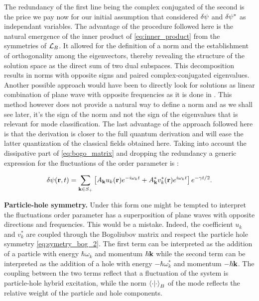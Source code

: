The redundancy of the first line being the complex conjugated of the second is the price we pay now for our initial assumption that considered $\delta\psi$ and $\delta\psi^*$ as independant variables. The advantage of the
procedure followed here is the natural emergence of the inner product of \autoref{eq:inner_product} from the symmetries of $\mathcal{L}_B$. It allowed for the definition of a norm and the establishment of orthogonality among the eigenvectors, 
thereby revealing the structure of the solution space as the direct sum of two dual subspaces. This decomposition results in norms with opposite signs and paired complex-conjugated eigenvalues. Another possible approach would have been
to directly look for solutions as linear combination of plane wave with opposite frequencies as it is done in \cite{pethick_bose-einstein_2008}. This method however does not provide a natural way to define a norm and as we shall
see later, it's the sign of the norm and not the sign of the eigenvalues that is relevant for mode classification. The last advantage of the approach followed here is that the derivation
is closer to the full quantum derivation and will ease the latter quantization of the classical fields obtained here. Taking into account the dissipative part of \autoref{eq:bogo_matrix} and dropping the redundancy a generic
expression for the fluctuations of the order parameter is :

\begin{equation}
    \delta\psi(\mathbf{r},t) = \sum_{\mathbf{k} \in S_+} \left[A_{\mathbf{k}} u_k(\mathbf{r})e^{-i\omega_kt}+A_{\mathbf{k}}^*v_k^*(\mathbf{r})e^{i\omega_kt}\right]e^{-\gamma t/2}.
    \label{eq:fluctuation_order_parameter}
\end{equation}
\bigskip

\textbf{Particle-hole symmetry.} Under this form one might be tempted to interpret the fluctuations order parameter has a superposition of plane waves with opposite directions and frequencies.
This would be a mistake. Indeed, the coefficient $u_k$ and $v_k^*$ are coupled through the Bogoliubov matrix and respect the particle hole symmetry \autoref{eq:symetry_bog_2}. The first term
can be interpreted as the addition of a particle with energy $\hbar\omega_k$ and momentum $\hbar\mathbf{k}$ while the second term can be interpreted as the addition of a hole with energy $-\hbar\omega_k^*$ and momentum $-\hbar\mathbf{k}$. The coupling
between the two terms reflect that a fluctuation of the system is particle-hole hybrid excitation, while the norm $\bra{\cdot}\ket{\cdot}_B$ of the mode reflects the relative weight of the particle and hole components.

